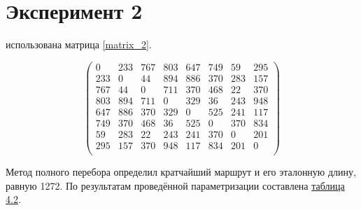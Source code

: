 \section{Эксперимент 2}
 использована матрица \ref{matrix_2}.

\begin{scriptsize} 
	\begin{equation}\label{matrix_2}
		\left(
		\begin{array}{cccccccc}
			 0& 233& 767& 803& 647& 749& 59& 295\\
			233&  0& 44& 894& 886& 370& 283& 157\\
			767& 44&  0& 711& 370& 468& 22& 370\\
			803& 894& 711&  0& 329& 36& 243& 948\\
			647& 886& 370& 329&  0& 525& 241& 117\\
			749& 370& 468& 36& 525&  0& 370& 834\\
			59& 283& 22& 243& 241& 370&  0& 201\\
			295& 157& 370& 948& 117& 834& 201&  0\\
		\end{array}\right)
\end{equation} \end{scriptsize}

Метод полного перебора определил кратчайший маршрут и его эталонную длину, равную 1272. По результатам проведённой параметризации составлена \hyperref[table_2]{таблица 4.2}.



